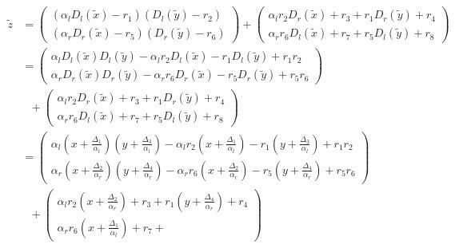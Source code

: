 \begin{align*}
  \widetilde{z} & =
  \begin{pmatrix}
    (\alpha_l D_l(\widetilde{x})-r_1)
    (         D_l(\widetilde{y})-r_2) \\
    (\alpha_r D_r(\widetilde{x})-r_5)
    (         D_r(\widetilde{y})-r_6)
  \end{pmatrix}
  +
  \begin{pmatrix}
    \alpha_lr_2 D_r(\widetilde{x}) + r_3 +
    r_1         D_r(\widetilde{y}) + r_4 \\
    \alpha_rr_6 D_l(\widetilde{x}) + r_7 +
    r_5         D_l(\widetilde{y}) + r_8
  \end{pmatrix} \\
%
  & =
  \begin{pmatrix}
    \alpha_l     D_l(\widetilde{x}) D_l(\widetilde{y})
    -\alpha_lr_2 D_l(\widetilde{x})
    -r_1         D_l(\widetilde{y})
    +r_1r_2 \\
    \alpha_r     D_r(\widetilde{x}) D_r(\widetilde{y})
    -\alpha_rr_6 D_r(\widetilde{x})
    -r_5         D_r(\widetilde{y})
    +r_5r_6
  \end{pmatrix} \\
  &\ \ \ +
  \begin{pmatrix}
    \alpha_lr_2 D_r(\widetilde{x}) + r_3 +
    r_1         D_r(\widetilde{y}) + r_4 \\
    \alpha_rr_6 D_l(\widetilde{x}) + r_7 +
    r_5         D_l(\widetilde{y}) + r_8
  \end{pmatrix} \\
%
  & =
  \begin{pmatrix}
    \alpha_l     \left(x + \frac{\Delta_1}{\alpha_l}\right)
                 \left(y + \frac{\Delta_3}{\alpha_l}\right)
    -\alpha_lr_2 \left(x + \frac{\Delta_1}{\alpha_l}\right)
    -r_1         \left(y + \frac{\Delta_3}{\alpha_l}\right)
    +r_1r_2 \\
    \alpha_r     \left(x + \frac{\Delta_2}{\alpha_r}\right)
                 \left(y + \frac{\Delta_4}{\alpha_r}\right)
    -\alpha_rr_6 \left(x + \frac{\Delta_2}{\alpha_r}\right)
    -r_5         \left(y + \frac{\Delta_4}{\alpha_r}\right)
    + r_5r_6
  \end{pmatrix} \\
  &\ \ \ +
  \begin{pmatrix}
    \alpha_lr_2  \left(x + \frac{\Delta_2}{\alpha_r}\right) + r_3 +
    r_1          \left(y + \frac{\Delta_4}{\alpha_r}\right) + r_4 \\
    \alpha_rr_6  \left(x + \frac{\Delta_1}{\alpha_l}\right) + r_7 +

\end{pmatrix}
\end{align*}
